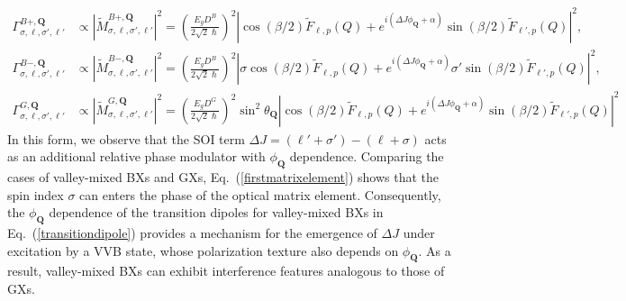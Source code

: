 \begin{equation}
\begin{aligned}
\Gamma_{\sigma, \ell, \sigma', \ell'}^{B+, \boldsymbol{Q}}
&\propto
\left|\tilde{M}_{\sigma, \ell, \sigma', \ell'}^{B+, \boldsymbol{Q}}\right|^2
=\left( \frac{E_g D^B}{2\sqrt{2}\hslash} \right)^2
 \left| \cos(\beta/2)\tilde{F}_{\ell, p}(Q) + e^{i(\Delta J \phi_{\boldsymbol{Q}} + \alpha)} \sin(\beta/2)\tilde{F}_{\ell', p}(Q) \right|^2, \\
\Gamma_{\sigma, \ell, \sigma', \ell'}^{B-, \boldsymbol{Q}}
&\propto
\left|\tilde{M}_{\sigma, \ell, \sigma', \ell'}^{B-, \boldsymbol{Q}}\right|^2
=\left( \frac{E_g D^B}{2\sqrt{2}\hslash} \right)^2
\left| \sigma\cos(\beta/2)\tilde{F}_{\ell, p}(Q) + e^{i(\Delta J \phi_{\boldsymbol{Q}} + \alpha)} \sigma'\sin(\beta/2)\tilde{F}_{\ell', p}(Q) \right|^2, \\
\Gamma_{\sigma, \ell, \sigma', \ell'}^{G, \boldsymbol{Q}}
&\propto
\left|\tilde{M}_{\sigma, \ell, \sigma', \ell'}^{G, \boldsymbol{Q}}\right|^2
=\left( \frac{E_g D^G}{2\sqrt{2}\hslash} \right)^2
\sin^2 \theta_{\boldsymbol{Q}} \left| \cos(\beta/2)\tilde{F}_{\ell, p}(Q) + e^{i(\Delta J \phi_{\boldsymbol{Q}} + \alpha)} \sin(\beta/2)\tilde{F}_{\ell', p}(Q) \right|^2 %
\end{aligned}
\label{eq:transition_rates_complex}
\end{equation}
In this form, we observe that the SOI term $\Delta J = (\ell' + \sigma') - (\ell + \sigma)$ acts as an additional relative phase modulator with $\phi_{\boldsymbol{Q}}$ dependence. Comparing the cases of valley-mixed BXs and GXs, Eq.~(\ref{firstmatrixelement}) shows that the spin index $\sigma$ can enters the phase of the optical matrix element. Consequently, the $\phi_{\boldsymbol{Q}}$ dependence of the transition dipoles for valley-mixed BXs in Eq.~(\ref{transitiondipole}) provides a mechanism for the emergence of $\Delta J$ under excitation by a VVB state, whose polarization texture also depends on $\phi_{\boldsymbol{Q}}$. As a result, valley-mixed BXs can exhibit interference features analogous to those of GXs.

